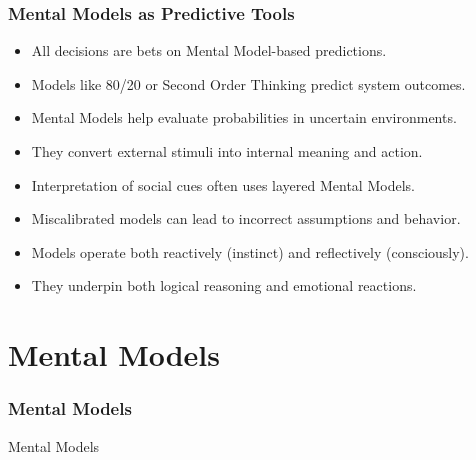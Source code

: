 \begin{frame}[fragile]\frametitle{Mental Models as Predictive Tools}
      \begin{itemize}
        \item All decisions are bets on Mental Model-based predictions.
        \item Models like 80/20 or Second Order Thinking predict system outcomes.
        \item Mental Models help evaluate probabilities in uncertain environments.
        \item They convert external stimuli into internal meaning and action.
        \item Interpretation of social cues often uses layered Mental Models.
        \item Miscalibrated models can lead to incorrect assumptions and behavior.
        \item Models operate both reactively (instinct) and reflectively (consciously).
        \item They underpin both logical reasoning and emotional reactions.
      \end{itemize}
\end{frame}




\section{Mental Models}

\begin{frame}[fragile]\frametitle{Mental Models}
\begin{center}
{\Large Mental Models}
\end{center}
\end{frame}

